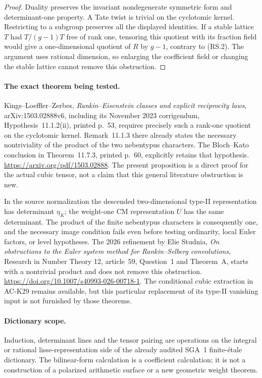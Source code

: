 \begin{proof}
Duality preserves the invariant nondegenerate symmetric
form and determinant-one property.  A Tate twist is trivial
on the cyclotomic kernel.  Restricting to a subgroup preserves
all the displayed identities.
If a stable lattice $T$ had $T/(g-1)T$ free of rank one,
tensoring this quotient with its fraction field would give
a one-dimensional quotient of $R$ by $g-1$, contrary to
(RS.2).  The argument uses rational dimension, so enlarging
the coefficient field or changing the stable lattice cannot
remove this obstruction.
\end{proof}

\paragraph{The exact theorem being tested.}
Kings--Loeffler--Zerbes, \emph{Rankin--Eisenstein classes and
explicit reciprocity laws}, arXiv:1503.02888v6, including its
November 2023 corrigendum, Hypothesis~11.1.2(ii), printed
p.~53, requires precisely such a rank-one quotient on the
cyclotomic kernel.  Remark~11.1.3 there already states the
necessary nontriviality of the product of the two nebentypus
characters.  The Bloch--Kato conclusion in Theorem~11.7.3,
printed p.~60, explicitly retains that hypothesis.
\url{https://arxiv.org/pdf/1503.02888}.
The present proposition is a direct proof for the actual
cubic tensor, not a claim that this general literature
obstruction is new.

In the source normalization the descended two-dimensional
type-II representation has determinant $\eta_K$; the
weight-one CM representation $U$ has the same determinant.
The product of the finite nebentypus characters is consequently
one, and the necessary image condition fails even before
testing ordinarity, local Euler factors, or level hypotheses.
The 2026 refinement by Elie Studnia,
\emph{On obstructions to the Euler system method for
Rankin--Selberg convolutions}, Research in Number Theory
12, article~59, Question~1 and Theorem~A, starts with a
nontrivial product and does not remove this obstruction.
\url{https://doi.org/10.1007/s40993-026-00718-1}.
The conditional cubic extraction in AC-K29 remains available,
but this particular replacement of its type-II vanishing input
is not furnished by those theorems.

\paragraph{Dictionary scope.}
Induction, determinant lines and the tensor pairing are
operations on the integral or rational lisse-representation
side of the already audited SGA~1 finite-\'etale dictionary.
The bilinear-form calculation is a coefficient calculation;
it is not a construction of a polarized arithmetic surface
or a new geometric weight theorem.

